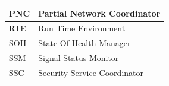 \begin{longtable}{|l|l|}
\begin{minipage}{0.31\linewidth}\raggedright\vspace{.75ex}PNC\vspace{.75ex}\end{minipage} & \begin{minipage}{0.63\linewidth}\raggedright\vspace{.75ex}Partial Network Coordinator\vspace{.75ex}\end{minipage}\\\hline
\begin{minipage}{0.31\linewidth}\raggedright\vspace{.75ex}RTE\vspace{.75ex}\end{minipage} & \begin{minipage}{0.63\linewidth}\raggedright\vspace{.75ex}Run Time Environment\vspace{.75ex}\end{minipage}\\\hline
\begin{minipage}{0.31\linewidth}\raggedright\vspace{.75ex}SOH\vspace{.75ex}\end{minipage} & \begin{minipage}{0.63\linewidth}\raggedright\vspace{.75ex}State Of Health Manager\vspace{.75ex}\end{minipage}\\\hline
\begin{minipage}{0.31\linewidth}\raggedright\vspace{.75ex}SSM\vspace{.75ex}\end{minipage} & \begin{minipage}{0.63\linewidth}\raggedright\vspace{.75ex}Signal Status Monitor\vspace{.75ex}\end{minipage}\\\hline
\begin{minipage}{0.31\linewidth}\raggedright\vspace{.75ex}SSC\vspace{.75ex}\end{minipage} & \begin{minipage}{0.63\linewidth}\raggedright\vspace{.75ex}Security Service Coordinator\vspace{.75ex}\end{minipage}\\\hline

\end{longtable}
